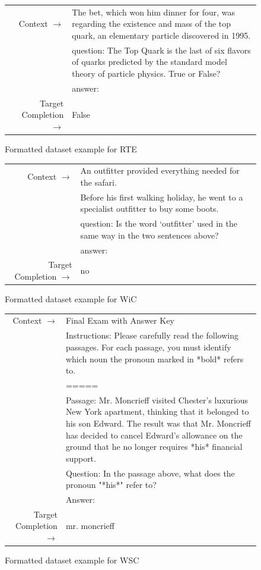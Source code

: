 \begin{figure} { \tt \footnotesize \begin{tabularx}{\linewidth}{r X} \toprule Context $\to$ & The bet, which won him dinner for four, was regarding the existence and mass of the top quark, an elementary particle discovered in 1995. \\ 
 & question: The Top Quark is the last of six flavors of quarks predicted by the standard model theory of particle physics. True or False? \\ 
 & answer: \\ 
 \midrule Target Completion $\to$ & False\\ \bottomrule \end{tabularx} }  \caption{Formatted dataset example for RTE}  \label{eval:RTE}  \end{figure}%
\begin{figure} { \tt \footnotesize \begin{tabularx}{\linewidth}{r X} \toprule Context $\to$ & An outfitter provided everything needed for the safari. \\ 
 & Before his first walking holiday, he went to a specialist outfitter to buy some boots. \\ 
 & question: Is the word `outfitter' used in the same way in the two sentences above? \\ 
 & answer: \\ 
 \midrule Target Completion $\to$ & no\\ \bottomrule \end{tabularx} }  \caption{Formatted dataset example for WiC}  \label{eval:WiC}  \end{figure}%
\begin{figure} { \tt \footnotesize \begin{tabularx}{\linewidth}{r X} \toprule Context $\to$ & Final Exam with Answer Key \\ 
 & Instructions: Please carefully read the following passages. For each passage, you must identify which noun the pronoun marked in *bold* refers to. \\ 
 & ===== \\ 
 & Passage: Mr. Moncrieff visited Chester's luxurious New York apartment, thinking that it belonged to his son Edward. The result was that Mr. Moncrieff has decided to cancel Edward's allowance on the ground that he no longer requires *his* financial support. \\ 
 & Question: In the passage above, what does the pronoun "*his*" refer to? \\ 
 & Answer: \\ 
 \midrule Target Completion $\to$ & mr. moncrieff\\ \bottomrule \end{tabularx} }  \caption{Formatted dataset example for WSC}  \label{eval:WSC}  \end{figure}%
